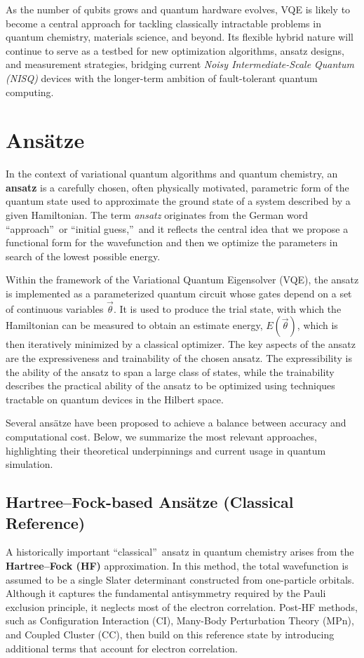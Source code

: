 As the number of qubits grows and quantum hardware evolves, VQE is likely to become a central approach for tackling classically intractable problems in quantum chemistry, materials science, and beyond. Its flexible hybrid nature will continue to serve as a testbed for new optimization algorithms, ansatz designs, and measurement strategies, bridging current \emph{Noisy Intermediate-Scale Quantum (NISQ)} devices with the longer-term ambition of fault-tolerant quantum computing.

\section{Ans\"{a}tze}
In the context of variational quantum algorithms and quantum chemistry, an \textbf{ansatz} is a carefully chosen, often physically motivated, parametric form of the quantum state used to approximate the ground state of a system described by a given Hamiltonian. The term \textit{ansatz} originates from the German word \textquotedblleft approach\textquotedblright\ or \textquotedblleft initial guess,\textquotedblright\ and it reflects the central idea that we propose a functional form for the wavefunction and then we optimize the parameters in search of the lowest possible energy. 

Within the framework of the Variational Quantum Eigensolver (VQE), the ansatz is implemented as a parameterized quantum circuit whose gates depend on a set of continuous variables $\vec{\theta}$. It is used to produce the trial state, with which the Hamiltonian can be measured to obtain an estimate energy, $E(\vec{\theta})$, which is then iteratively minimized by a classical optimizer. The key aspects of the ansatz are the expressiveness and trainability of the chosen ansatz. The expressibility is the ability of the ansatz to span a large class of states, while the trainability describes the practical ability of the ansatz to be optimized using techniques tractable on quantum devices 
in the Hilbert space. 

Several ans\"{a}tze have been proposed to achieve a balance between accuracy and computational cost. Below, we summarize the most relevant approaches, highlighting their theoretical underpinnings and current usage in quantum simulation\cite{VQE_review}.

\subsection{Hartree--Fock-based Ans\"{a}tze (Classical Reference)}
A historically important \textquotedblleft classical\textquotedblright\ ansatz in quantum chemistry arises from the \textbf{Hartree--Fock (HF)}\cite{wiki:hartree_fock_method} approximation. In this method, the total wavefunction is assumed to be a single Slater determinant constructed from one-particle orbitals. Although it captures the fundamental antisymmetry required by the Pauli exclusion principle, it neglects most of the electron correlation. Post-HF methods, such as Configuration Interaction (CI), Many-Body Perturbation Theory (MPn), and Coupled Cluster (CC), then build on this reference state by introducing additional terms that account for electron correlation.\cite{wiki:post_hartree_fock}  


